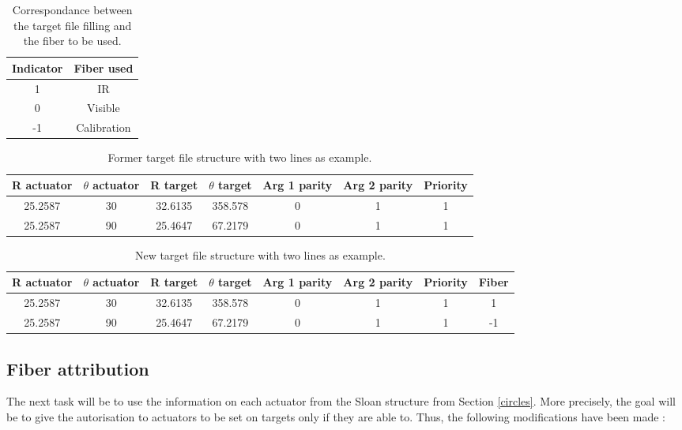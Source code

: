 \begin{table}[h]
	\begin{center}
	\begin{tabular}{|c|c|}
	\hline
	Indicator & Fiber used  \\
	\hline
1 & IR \\
0 & Visible \\
-1 & Calibration \\
	\hline
	\end{tabular}
	\caption{Correspondance between the target file filling and the fiber to be used.}
	\label{table:set_target:target_file_fiber}
	\end{center}
\end{table}

\begin{table}[h]
	\begin{tabular}{|c|c|c|c|c|c|c|}
	\hline
	R actuator & $\theta$ actuator & R target & $\theta$ target & Arg 1 parity & Arg 2 parity & Priority \\
	\hline
25.2587	& 30 & 32.6135 & 358.578	 & 0 & 1 & 1 \\
25.2587	& 90 & 25.4647 & 67.2179 & 0 & 1 & 1 \\
	\hline
	\end{tabular}
	\caption{Former target file structure with two lines as example.}
	\label{table:set_target:former_target}
\end{table}

\begin{table}[h]
	\begin{tabular}{|c|c|c|c|c|c|c|c|}
	\hline
	R actuator & $\theta$ actuator & R target & $\theta$ target & Arg 1 parity & Arg 2 parity & Priority & Fiber \\
	\hline
25.2587	& 30 & 32.6135 & 358.578	 & 0 & 1 & 1 & 1 \\
25.2587	& 90 & 25.4647 & 67.2179 & 0	 & 1	 & 1 & -1 \\
	\hline
	\end{tabular}
	\caption{New target file structure with two lines as example.}
	\label{table:set_target:new_target}
\end{table}




\subsection{Fiber attribution} \label{fiber_attribution}

The next task will be to use the information on each actuator from the Sloan structure from Section \ref{circles}. More precisely, the goal will be to give the autorisation to actuators to be set on targets only if they are able to. Thus, the following modifications have been made : 

